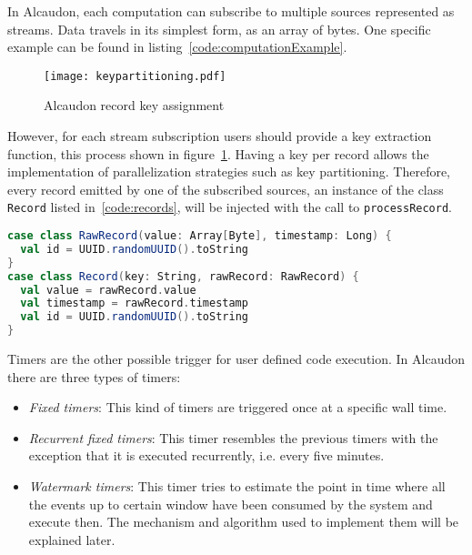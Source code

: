 In Alcaudon, each computation can subscribe to multiple sources represented as
streams. Data travels in its simplest form, as an array of bytes. One specific
example can be found in listing~\ref{code:computationExample}.

\begin{figure}
  \begin{center}
    \texttt{[image: keypartitioning.pdf]}
    \caption{Alcaudon record key assignment}
    \label{fig:keypartitioning}
  \end{center}
\end{figure}

However, for each stream subscription users should provide a key extraction
function, this process shown in figure~\ref{fig:keypartitioning}. Having a key
per record allows the implementation of parallelization strategies such as key
partitioning. Therefore, every record emitted by one of the subscribed sources,
an instance of the class \lstinline[columns=fixed]{Record} listed
in~\ref{code:records}, will be injected with the call to
\lstinline[columns=fixed]{processRecord}.

\begin{lstlisting}[language=scala, frame=trBL, label=code:records, float=ht, caption = {Record classes}]
case class RawRecord(value: Array[Byte], timestamp: Long) {
  val id = UUID.randomUUID().toString
}
case class Record(key: String, rawRecord: RawRecord) {
  val value = rawRecord.value
  val timestamp = rawRecord.timestamp
  val id = UUID.randomUUID().toString
}
\end{lstlisting}

Timers are the other possible trigger for user defined code execution. In
Alcaudon there are three types of timers:

\begin{itemize}
\item \textit{Fixed timers}: This kind of timers are triggered once at a
  specific wall time.
\item \textit{Recurrent fixed timers}: This timer resembles the previous timers
  with the exception that it is executed recurrently, i.e. every five minutes.
\item \textit{Watermark timers}: This timer tries to estimate the point in time
  where all the events up to certain window have been consumed by the system and
  execute then. The mechanism and algorithm used to implement them will be
  explained later.
\end{itemize}

